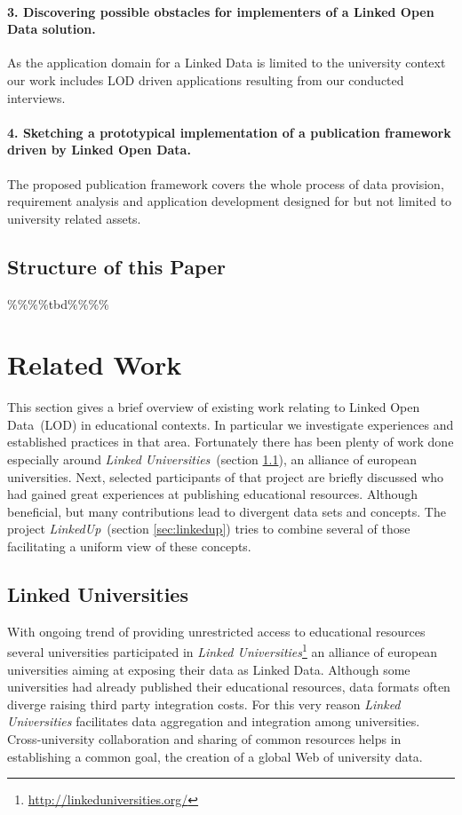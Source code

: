 \documentclass{article}
\begin{document}
\paragraph{3. Discovering possible obstacles for implementers of a Linked Open Data solution.}
As the application domain for a Linked Data is limited to the university context our work includes LOD driven applications resulting from our conducted interviews.
\paragraph{4. Sketching a prototypical implementation of a publication framework driven by Linked Open Data.}
The proposed publication framework covers the whole process of data provision, requirement analysis and application development designed for but not limited to university related assets.  
\subsection{Structure of this Paper}
\%\%\%\%tbd\%\%\%\%

\section{Related Work}
This section gives a brief overview of existing work relating to Linked Open Data~(LOD) in educational contexts. In particular we investigate experiences and established practices in that area. Fortunately there has been plenty of work done especially around \textit{Linked Universities}~(section \ref{sec:linked_universities}), an alliance of european universities. Next, selected participants of that project are briefly discussed who had gained great experiences at publishing educational resources. Although beneficial, but many contributions lead to divergent data sets and concepts. The project \textit{LinkedUp}~(section \ref{sec:linkedup}) tries to combine several of those facilitating a uniform view of these concepts.

\subsection{Linked Universities}
\label{sec:linked_universities}
With ongoing trend of providing unrestricted access to educational resources several universities participated in \textit{Linked Universities}\footnote{\url{http://linkeduniversities.org/}} an alliance of european universities aiming at exposing their data as Linked Data. Although some universities had already published their educational resources, data formats often diverge raising third party integration costs. For this very reason \textit{Linked Universities} facilitates data aggregation and integration among universities. Cross-university collaboration and sharing of common resources helps in establishing a common goal, the creation of a global Web of university data. 
\end{document}
